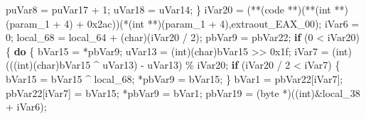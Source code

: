\documentclass[
]{article}
\newenvironment{Shaded}{}{}
\newcommand{\BaseNTok}[1]{\textcolor[rgb]{0.25,0.63,0.44}{#1}}
\newcommand{\ControlFlowTok}[1]{\textcolor[rgb]{0.00,0.44,0.13}{\textbf{#1}}}
\newcommand{\DataTypeTok}[1]{\textcolor[rgb]{0.56,0.13,0.00}{#1}}
\newcommand{\DecValTok}[1]{\textcolor[rgb]{0.25,0.63,0.44}{#1}}
\newcommand{\NormalTok}[1]{#1}
\newcommand{\OperatorTok}[1]{\textcolor[rgb]{0.40,0.40,0.40}{#1}}
\begin{document}
\begin{Shaded}
\begin{Highlighting}[]
\NormalTok{    puVar8 }\OperatorTok{=}\NormalTok{ puVar17 }\OperatorTok{+} \DecValTok{1}\OperatorTok{;}
\NormalTok{    uVar18 }\OperatorTok{=}\NormalTok{ uVar14}\OperatorTok{;}
  \OperatorTok{\}}
\NormalTok{  iVar20 }\OperatorTok{=} \OperatorTok{(**(}\NormalTok{code }\OperatorTok{**)(**(}\DataTypeTok{int} \OperatorTok{**)(}\NormalTok{param\_1 }\OperatorTok{+} \DecValTok{4}\OperatorTok{)} \OperatorTok{+} \BaseNTok{0x2ac}\OperatorTok{))(*(}\DataTypeTok{int} \OperatorTok{**)(}\NormalTok{param\_1 }\OperatorTok{+} \DecValTok{4}\OperatorTok{),}\NormalTok{extraout\_EAX\_00}\OperatorTok{);}
\NormalTok{  iVar6 }\OperatorTok{=} \DecValTok{0}\OperatorTok{;}
\NormalTok{  local\_68 }\OperatorTok{=}\NormalTok{ local\_64 }\OperatorTok{+} \OperatorTok{(}\DataTypeTok{char}\OperatorTok{)(}\NormalTok{iVar20 }\OperatorTok{/} \DecValTok{2}\OperatorTok{);}
\NormalTok{  pbVar9 }\OperatorTok{=}\NormalTok{ pbVar22}\OperatorTok{;}
  \ControlFlowTok{if} \OperatorTok{(}\DecValTok{0} \OperatorTok{\textless{}}\NormalTok{ iVar20}\OperatorTok{)} \OperatorTok{\{}
    \ControlFlowTok{do} \OperatorTok{\{}
\NormalTok{      bVar15 }\OperatorTok{=} \OperatorTok{*}\NormalTok{pbVar9}\OperatorTok{;}
\NormalTok{      uVar13 }\OperatorTok{=} \OperatorTok{(}\DataTypeTok{int}\OperatorTok{)(}\DataTypeTok{char}\OperatorTok{)}\NormalTok{bVar15 }\OperatorTok{\textgreater{}\textgreater{}} \BaseNTok{0x1f}\OperatorTok{;}
\NormalTok{      iVar7 }\OperatorTok{=} \OperatorTok{(}\DataTypeTok{int}\OperatorTok{)(((}\DataTypeTok{int}\OperatorTok{)(}\DataTypeTok{char}\OperatorTok{)}\NormalTok{bVar15 }\OperatorTok{\^{}}\NormalTok{ uVar13}\OperatorTok{)} \OperatorTok{{-}}\NormalTok{ uVar13}\OperatorTok{)} \OperatorTok{\%}\NormalTok{ iVar20}\OperatorTok{;}
      \ControlFlowTok{if} \OperatorTok{(}\NormalTok{iVar20 }\OperatorTok{/} \DecValTok{2} \OperatorTok{\textless{}}\NormalTok{ iVar7}\OperatorTok{)} \OperatorTok{\{}
\NormalTok{        bVar15 }\OperatorTok{=}\NormalTok{ bVar15 }\OperatorTok{\^{}}\NormalTok{ local\_68}\OperatorTok{;}
        \OperatorTok{*}\NormalTok{pbVar9 }\OperatorTok{=}\NormalTok{ bVar15}\OperatorTok{;}
      \OperatorTok{\}}
\NormalTok{      bVar1 }\OperatorTok{=}\NormalTok{ pbVar22}\OperatorTok{[}\NormalTok{iVar7}\OperatorTok{];}
\NormalTok{      pbVar22}\OperatorTok{[}\NormalTok{iVar7}\OperatorTok{]} \OperatorTok{=}\NormalTok{ bVar15}\OperatorTok{;}
      \OperatorTok{*}\NormalTok{pbVar9 }\OperatorTok{=}\NormalTok{ bVar1}\OperatorTok{;}
\NormalTok{      pbVar19 }\OperatorTok{=} \OperatorTok{(}\NormalTok{byte }\OperatorTok{*)((}\DataTypeTok{int}\OperatorTok{)\&}\NormalTok{local\_38 }\OperatorTok{+}\NormalTok{ iVar6}\OperatorTok{);}

\end{Highlighting}
\end{Shaded}
\end{document}
